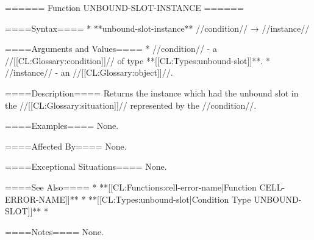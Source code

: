 ====== Function UNBOUND-SLOT-INSTANCE ======

====Syntax====
  * **unbound-slot-instance** //condition// → //instance//

====Arguments and Values====
  * //condition// - a //[[CL:Glossary:condition]]// of type **[[CL:Types:unbound-slot]]**.
  * //instance// - an //[[CL:Glossary:object]]//.

====Description====
Returns the instance which had the unbound slot in the //[[CL:Glossary:situation]]// represented by the //condition//.

====Examples====
None.

====Affected By====
None.

====Exceptional Situations====
None.

====See Also====
  * **[[CL:Functions:cell-error-name|Function CELL-ERROR-NAME]]**
  * **[[CL:Types:unbound-slot|Condition Type UNBOUND-SLOT]]**
  * {\secref\ConditionSystemConcepts}

====Notes====
None.

